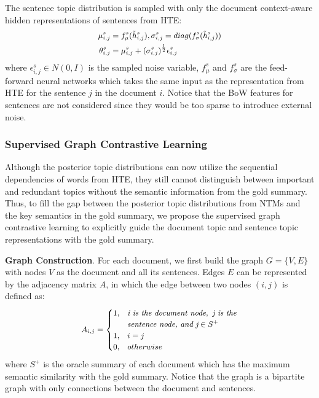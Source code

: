 \documentclass[11pt]{article}
\begin{document}
The sentence topic distribution is sampled with only the document context-aware hidden representations of sentences from HTE:
\begin{equation}
\small
\begin{split}
\mu^s_{i,j} &= f_{\mu}^s(\tilde{h}^s_{i,j}), \sigma^s_{i,j} = diag(f_{\sigma}^s(\tilde{h}^s_{i,j}))\\
\theta^s_{i,j} &= \mu^s_{i,j} + {(\sigma^s_{i,j})}^{\frac{1}{2}}\epsilon^s_{i,j}\\
\label{eq:2}
\end{split}
\end{equation}
where $\epsilon^s_{i,j} \in N(0, I)$ is the sampled noise variable, $f_{\mu}^s$ and $f_{\sigma}^s$ are the feed-forward neural networks which takes the same input as the representation from HTE for the sentence $j$ in the document $i$.
Notice that the BoW features for sentences are not considered since they would be too sparse to introduce external noise.

\subsubsection{Supervised Graph Contrastive Learning}
Although the posterior topic distributions can now utilize the sequential dependencies of words from HTE, they still cannot distinguish between important and redundant topics without the semantic information from the gold summary.
Thus, to fill the gap between the posterior topic distributions from NTMs and the key semantics in the gold summary, we propose the supervised graph contrastive learning to explicitly guide the document topic and sentence topic representations with the gold summary.

\textbf{Graph Construction}. For each document, we first build the graph $G=\{V, E\}$ with nodes $V$ as the document and all its sentences.
Edges $E$ can be represented by the adjacency matrix $A$, in which the edge between two nodes $(i, j)$ is defined as:
\begin{equation}
\small
   \begin{aligned}
A_{i,j} = \begin{cases} 1, & \textit{i is the document node}, \textit{ j is the}\\ 
&\textit{sentence node, and j} \in S^+\\
                         1, & i=j\\
                         0, & otherwise
          \end{cases}
\label{eq:a}
\end{aligned}
\end{equation}where $S^+$ is the oracle summary of each document which has the maximum semantic similarity with the gold summary.
Notice that the graph is a bipartite graph with only connections between the document and sentences.
\end{document}
